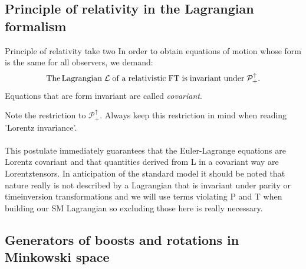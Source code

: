\subsection{Principle of relativity in the Lagrangian formalism }
\begin{mybox}{Principle of relativity take two}
	In order to obtain equations of motion whose form is the same for all observers, we demand:
	\begin{equation}
	\mathrm{The\, Lagrangian \; \mathcal{L} \;of \;a \;relativistic\; FT\; is\; invariant \;under \;\mathcal{P}^\uparrow_+}.
		\end{equation}
		Equations that are form invariant are called \emph{covariant}.
	\end{mybox}
	Note the restriction to $\mathcal{P}^\uparrow_+$. Always keep this restriction in mind when reading ’Lorentz invariance’.
	\\
	\\
	This postulate immediately guarantees that the Euler-Lagrange equations are Lorentz covariant
	and that quantities derived from L in a covariant way are Lorentztensors.
	In anticipation of the standard model it should be noted that nature really is not described by a
	Lagrangian that is invariant under parity or timeinversion transformations and we will use terms
	violating P and T when building our SM Lagrangian so excluding those here is really necessary.
\subsection{Generators of boosts and rotations in Minkowski space}

























